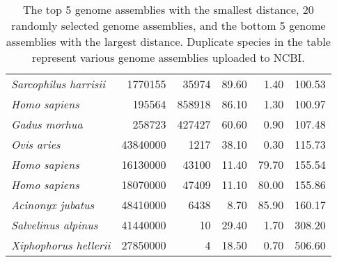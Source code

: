 \documentclass[twocolumn, dvipsnames]{bmcart}%
\begin{document}
\begin{backmatter}
\begin{table*}[t]
{\begin{tabular}{lrrrrr}
\textit{Sarcophilus harrisii} & 1770155 & 35974 & 89.60 & 1.40 & 100.53 \\
\textit{Homo sapiens} & 195564 & 858918 & 86.10 & 1.30 & 100.97 \\
\textit{Gadus morhua} & 258723 & 427427 & 60.60 & 0.90 & 107.48 \\
\textit{Ovis aries} & 43840000 & 1217 & 38.10 & 0.30 & 115.73 \\
\hline
\textit{Homo sapiens} & 16130000 & 43100 & 11.40 & 79.70 & 155.54 \\
\textit{Homo sapiens} & 18070000 & 47409 & 11.10 & 80.00 & 155.86 \\
\textit{Acinonyx jubatus} & 48410000 & 6438 & 8.70 & 85.90 & 160.17 \\
\textit{Salvelinus alpinus} & 41440000 & 10 & 29.40 & 1.70 & 308.20 \\
\textit{Xiphophorus hellerii} & 27850000 & 4 & 18.50 & 0.70 & 506.60 \\ \hline
\end{tabular}%
}
\caption{The top 5 genome assemblies with the smallest distance, 20 randomly selected genome assemblies, and the bottom 5 genome assemblies with the largest distance. Duplicate species in the table represent various genome assemblies uploaded to NCBI.}
\label{tab:distances}
\end{table*}





\end{backmatter}
\end{document}

